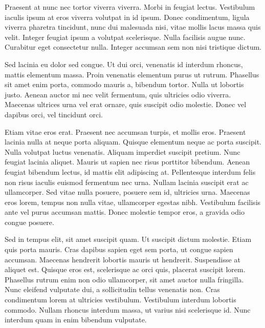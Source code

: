 Praesent at nunc nec tortor viverra viverra. Morbi in feugiat lectus. Vestibulum iaculis ipsum at eros viverra volutpat in id ipsum. Donec condimentum, ligula viverra pharetra tincidunt, nunc dui malesuada nisi, vitae mollis lacus massa quis velit. Integer feugiat ipsum a volutpat scelerisque. Nulla facilisis augue nunc. Curabitur eget consectetur nulla. Integer accumsan sem non nisi tristique dictum.

Sed lacinia eu dolor sed congue. Ut dui orci, venenatis id interdum rhoncus, mattis elementum massa. Proin venenatis elementum purus ut rutrum. Phasellus sit amet enim porta, commodo mauris a, bibendum tortor. Nulla ut lobortis justo. Aenean auctor mi nec velit fermentum, quis ultricies odio viverra. Maecenas ultrices urna vel erat ornare, quis suscipit odio molestie. Donec vel dapibus orci, vel tincidunt orci.

Etiam vitae eros erat. Praesent nec accumsan turpis, et mollis eros. Praesent lacinia nulla at neque porta aliquam. Quisque elementum neque ac porta suscipit. Nulla volutpat luctus venenatis. Aliquam imperdiet suscipit pretium. Nunc feugiat lacinia aliquet. Mauris ut sapien nec risus porttitor bibendum. Aenean feugiat bibendum lectus, id mattis elit adipiscing at. Pellentesque interdum felis non risus iaculis euismod fermentum nec urna. Nullam lacinia suscipit erat ac ullamcorper. Sed vitae nulla posuere, posuere sem id, ultricies urna. Maecenas eros lorem, tempus non nulla vitae, ullamcorper egestas nibh. Vestibulum facilisis ante vel purus accumsan mattis. Donec molestie tempor eros, a gravida odio congue posuere.

Sed in tempus elit, sit amet suscipit quam. Ut suscipit dictum molestie. Etiam quis porta mauris. Cras dapibus sapien eget sem porta, ut congue sapien accumsan. Maecenas hendrerit lobortis mauris ut hendrerit. Suspendisse at aliquet est. Quisque eros est, scelerisque ac orci quis, placerat suscipit lorem. Phasellus rutrum enim non odio ullamcorper, sit amet auctor nulla fringilla. Nunc eleifend vulputate dui, a sollicitudin tellus venenatis non. Cras condimentum lorem at ultricies vestibulum. Vestibulum interdum lobortis commodo. Nullam rhoncus interdum massa, ut varius nisi scelerisque id. Nunc interdum quam in enim bibendum vulputate.